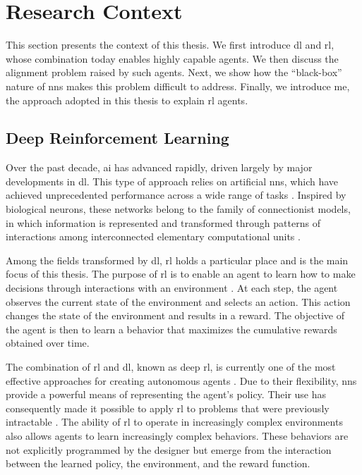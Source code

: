 \section{Research Context}
\label{sec:introduction_research_context}

This section presents the context of this thesis.
We first introduce \gls{dl} and \gls{rl}, whose combination today enables highly capable agents.
We then discuss the alignment problem raised by such agents.
Next, we show how the \enquote{black-box} nature of \glspl{nn} makes this problem difficult to address.
Finally, we introduce \gls{me}, the approach adopted in this thesis to explain \gls{rl} agents.

\subsection{Deep Reinforcement Learning}

Over the past decade, \gls{ai} has advanced rapidly, driven largely by major developments in \gls{dl}.
This type of approach relies on artificial \glspl{nn}, which have achieved unprecedented performance across a wide range of tasks \parencite{goodfellow2016deep}.
Inspired by biological neurons, these networks belong to the family of connectionist models, in which information is represented and transformed through patterns of interactions among interconnected elementary computational units \parencite{rumelhart1986learning}.

Among the fields transformed by \gls{dl}, \gls{rl} holds a particular place and is the main focus of this thesis.
The purpose of \gls{rl} is to enable an agent to learn how to make decisions through interactions with an environment \parencite{sutton2018reinforcement}.
At each step, the agent observes the current state of the environment and selects an action.
This action changes the state of the environment and results in a reward.
The objective of the agent is then to learn a behavior that maximizes the cumulative rewards obtained over time.

The combination of \gls{rl} and \gls{dl}, known as deep \gls{rl}, is currently one of the most effective approaches for creating autonomous agents \parencite{arulkumaran2017deep}.
Due to their flexibility, \glspl{nn} provide a powerful means of representing the agent's policy.
Their use has consequently made it possible to apply \gls{rl} to problems that were previously intractable \parencite{mnih2013playingatarideepreinforcement, silver2017mastering, openai2019dota2largescale}.
The ability of \gls{rl} to operate in increasingly complex environments also allows agents to learn increasingly complex behaviors.
These behaviors are not explicitly programmed by the designer but emerge from the interaction between the learned policy, the environment, and the reward function.

